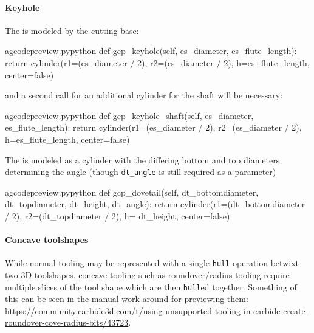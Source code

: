 \documentclass{ltxdoc}
\begin{document}
\begin{samepage}
\paragraph{Keyhole}

The  is modeled by the cutting base:

\lstset{firstnumber=\thegcpy}
\begin{writecode}{a}{gcodepreview.py}{python}
    def gcp_keyhole(self, es_diameter, es_flute_length):
        return cylinder(r1=(es_diameter / 2), r2=(es_diameter / 2), h=es_flute_length, center=false)

\end{writecode}
\addtocounter{gcpy}{3}

\noindent and a second call for an additional cylinder for the shaft will be necessary:

\lstset{firstnumber=\thegcpy}
\begin{writecode}{a}{gcodepreview.py}{python}
    def gcp_keyhole_shaft(self, es_diameter, es_flute_length):
        return cylinder(r1=(es_diameter / 2), r2=(es_diameter / 2), h=es_flute_length, center=false)

\end{writecode}
\addtocounter{gcpy}{3}
\end{samepage}

The  is modeled as a cylinder with the differing bottom and top diameters determining the angle (though \verb|dt_angle| is still required as a parameter)

\lstset{firstnumber=\thegcpy}
\begin{writecode}{a}{gcodepreview.py}{python}
    def gcp_dovetail(self, dt_bottomdiameter, dt_topdiameter, dt_height, dt_angle):
        return cylinder(r1=(dt_bottomdiameter / 2), r2=(dt_topdiameter / 2), h= dt_height, center=false)

\end{writecode}
\addtocounter{gcpy}{3}

\paragraph{Concave toolshapes}
\label{para:concavetoolshapes} 
While normal tooling may be represented with a single \texttt{hull} operation betwixt two 3D toolshapes, concave tooling such as roundover/radius tooling require multiple slices of the tool shape which are then \texttt{hull}ed together. Something of this can be seen in the manual work-around for previewing them: \url{https://community.carbide3d.com/t/using-unsupported-tooling-in-carbide-create-roundover-cove-radius-bits/43723}.
\end{document}
